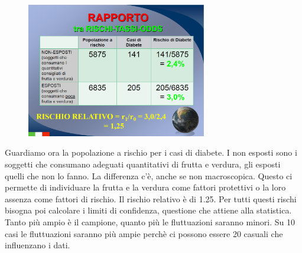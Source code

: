 \begin{figure}[!ht]
\centering
	\includegraphics[width=0.7\textwidth]{03/image16.png}
\end{figure}

Guardiamo ora la popolazione a rischio per i casi di diabete. I non
esposti sono i soggetti che consumano adeguati quantitativi di frutta e
verdura, gli esposti quelli che non lo fanno. La differenza c'è, anche
se non macroscopica. Questo ci permette di individuare la frutta e la
verdura come fattori protettivi o la loro assenza come fattori di
rischio. Il rischio relativo è di 1.25. Per tutti questi rischi bisogna
poi calcolare i limiti di confidenza, questione che attiene alla
statistica. Tanto più ampio è il campione, quanto più le fluttuazioni
saranno minori. Su 10 casi le fluttuazioni saranno più ampie perchè ci
possono essere 20 casuali che influenzano i dati.


